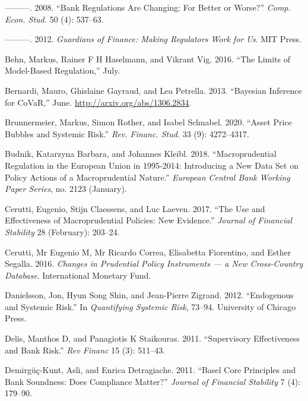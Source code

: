 \documentclass[
  10pt,
]{article}
\begin{document}
\leavevmode\hypertarget{ref-Barth2008}{}%
---------. 2008. ``Bank Regulations Are Changing: For Better or Worse?''
\emph{Comp. Econ. Stud.} 50 (4): 537--63.

\leavevmode\hypertarget{ref-Barth2012}{}%
---------. 2012. \emph{Guardians of Finance: Making Regulators Work for
Us}. MIT Press.

\leavevmode\hypertarget{ref-Behn2016}{}%
Behn, Markus, Rainer F H Haselmann, and Vikrant Vig. 2016. ``The Limits
of Model-Based Regulation,'' July.

\leavevmode\hypertarget{ref-Bernardi2013}{}%
Bernardi, Mauro, Ghislaine Gayraud, and Lea Petrella. 2013. ``Bayesian
Inference for CoVaR,'' June. \url{http://arxiv.org/abs/1306.2834}.

\leavevmode\hypertarget{ref-Brunnermeier2020}{}%
Brunnermeier, Markus, Simon Rother, and Isabel Schnabel. 2020. ``Asset
Price Bubbles and Systemic Risk.'' \emph{Rev. Financ. Stud.} 33 (9):
4272--4317.

\leavevmode\hypertarget{ref-Budnik2018}{}%
Budnik, Katarzyna Barbara, and Johannes Kleibl. 2018. ``Macroprudential
Regulation in the European Union in 1995-2014: Introducing a New Data
Set on Policy Actions of a Macroprudential Nature.'' \emph{European
Central Bank Working Paper Series}, no. 2123 (January).

\leavevmode\hypertarget{ref-Cerutti2017}{}%
Cerutti, Eugenio, Stijn Claessens, and Luc Laeven. 2017. ``The Use and
Effectiveness of Macroprudential Policies: New Evidence.'' \emph{Journal
of Financial Stability} 28 (February): 203--24.

\leavevmode\hypertarget{ref-Cerutti2016}{}%
Cerutti, Mr Eugenio M, Mr Ricardo Correa, Elisabetta Fiorentino, and
Esther Segalla. 2016. \emph{Changes in Prudential Policy Instruments ---
a New Cross-Country Database}. International Monetary Fund.

\leavevmode\hypertarget{ref-Danielsson2012}{}%
Danielsson, Jon, Hyun Song Shin, and Jean-Pierre Zigrand. 2012.
``Endogenous and Systemic Risk.'' In \emph{Quantifying Systemic Risk},
73--94. University of Chicago Press.

\leavevmode\hypertarget{ref-Delis2011}{}%
Delis, Manthos D, and Panagiotis K Staikouras. 2011. ``Supervisory
Effectiveness and Bank Risk.'' \emph{Rev Financ} 15 (3): 511--43.

\leavevmode\hypertarget{ref-Demirguc-Kunt2011}{}%
Demirgüç-Kunt, Asli, and Enrica Detragiache. 2011. ``Basel Core
Principles and Bank Soundness: Does Compliance Matter?'' \emph{Journal
of Financial Stability} 7 (4): 179--90.
\end{document}
